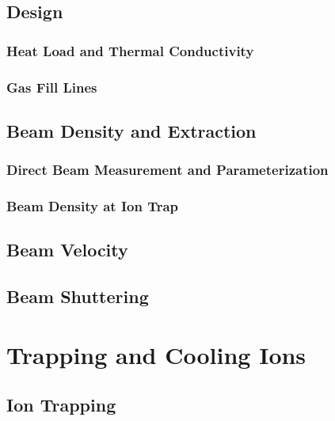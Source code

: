 \documentclass [PhD,nolistoftables,scheader] {uclathes}
\begin{document}
	\section{Design}
	
	
		\subsection{Heat Load and Thermal Conductivity}
		
		
		\subsection{Gas Fill Lines}
		
	
	\section{Beam Density and Extraction} \label{sec: beam density}
	
		
		\subsection{Direct Beam Measurement and Parameterization}
		
	
		\subsection{Beam Density at Ion Trap} \label{sec: trap beam density}
		
	
	\section{Beam Velocity}
	
	
	\section{Beam Shuttering}
	

\chapter{Trapping and Cooling Ions}


	\section{Ion Trapping}
	
	
\end{document}
